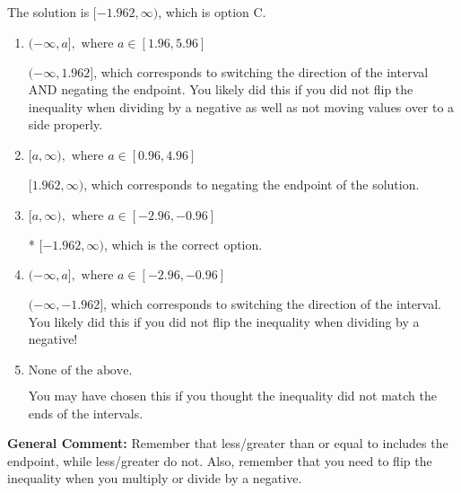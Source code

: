 \documentclass{extbook}[14pt]
\begin{document}
\begin{enumerate}
{The solution is \( [-1.962, \infty) \), which is option C.\begin{enumerate}[label=\Alph*.]
\item \( (-\infty, a], \text{ where } a \in [1.96, 5.96] \)

 $(-\infty, 1.962]$, which corresponds to switching the direction of the interval AND negating the endpoint. You likely did this if you did not flip the inequality when dividing by a negative as well as not moving values over to a side properly.
\item \( [a, \infty), \text{ where } a \in [0.96, 4.96] \)

 $[1.962, \infty)$, which corresponds to negating the endpoint of the solution.
\item \( [a, \infty), \text{ where } a \in [-2.96, -0.96] \)

* $[-1.962, \infty)$, which is the correct option.
\item \( (-\infty, a], \text{ where } a \in [-2.96, -0.96] \)

 $(-\infty, -1.962]$, which corresponds to switching the direction of the interval. You likely did this if you did not flip the inequality when dividing by a negative!
\item \( \text{None of the above}. \)

You may have chosen this if you thought the inequality did not match the ends of the intervals.
\end{enumerate}

\textbf{General Comment:} Remember that less/greater than or equal to includes the endpoint, while less/greater do not. Also, remember that you need to flip the inequality when you multiply or divide by a negative.
}
\end{enumerate}
\end{document}
